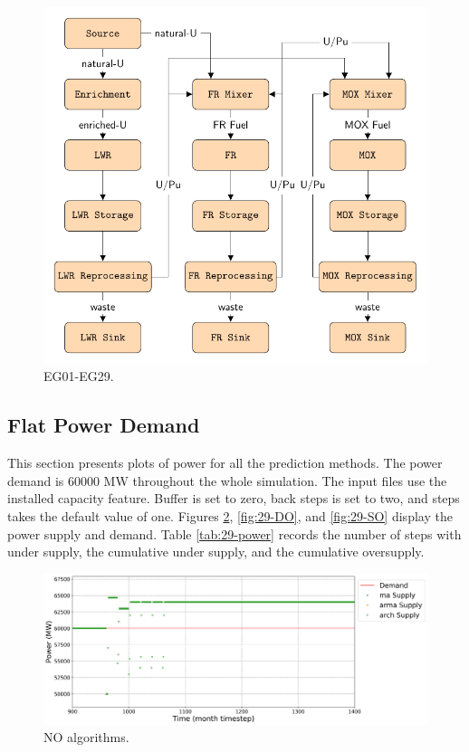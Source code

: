 \documentclass[11pt]{article}
\begin{document}
\begin{figure}[H]
	\centering
	\includegraphics[width=\textwidth]{29-figures/29flow.pdf} 
	\hfill
	\caption{EG01-EG29.}
	\label{fig:29flow}
\end{figure}

\subsection{Flat Power Demand}

This section presents plots of power for all the prediction methods. The power demand is 60000 MW throughout the whole simulation. The input files use the installed capacity feature. Buffer is set to zero, back steps is set to two, and steps takes the default value of one.
Figures \ref{fig:29-NO}, \ref{fig:29-DO}, and \ref{fig:29-SO} display the power supply and demand.
Table \ref{tab:29-power} records the number of steps with under supply, the cumulative under supply, and the cumulative oversupply.

\begin{figure}[H]
	\centering
	\includegraphics[width=\textwidth]{29-figures/29-power0-buffer01.png} 
	\hfill
	\caption{NO algorithms.}
	\label{fig:29-NO}
\end{figure}
\end{document}
